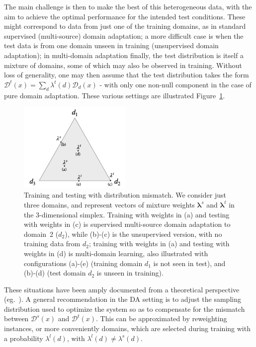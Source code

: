\documentclass[11pt]{article}
\newcommand{\vlambda}{\ensuremath{\boldsymbol\lambda}\xspace} %
\begin{document}
The main challenge is then to make the best of this heterogeneous data, with the aim to achieve the optimal performance for the intended test conditions. These might correspond to data from just one of the training domains, as in standard supervised (multi-source) domain adaptation; a more difficult case is when the test data is from one domain unseen in training (unsupervised domain adaptation); in multi-domain adaptation finally, the test distribution is itself a mixture of domains, some of which may also be observed in training.  Without loss of generality, one may then assume that the test distribution takes the form $\mathcal{D}^{t}(x) = \sum_d \lambda^{t}(d) \mathcal{D}_d(x)$ - with only one non-null  component in the case of pure domain adaptation.
These various settings are illustrated Figure~\ref{fig:mdmt-lambdas}.
\begin{figure}[h]
  \centering
  \includegraphics[width=0.48\textwidth]{mdmt-lambdas}
  \caption{Training and testing with distribution mismatch. We consider just three domains, and represent vectors of mixture weights $\vlambda^{s}$ and $\vlambda^{t}$ in the 3-dimensional simplex. Training with weights in (a) and testing with weights in (c) is supervised multi-source domain adaptation to domain~2 ($d_2$), while (b)-(c) is the unsupervised version, with no training data from $d_2$; training with weights in (a) and testing with weights in (d) is multi-domain learning, also illustrated with configurations (a)-(e) (training domain $d_1$ is not seen in test), and (b)-(d)  (test domain $d_2$ is unseen in training).}\label{fig:mdmt-lambdas}
\end{figure}

These situations have been amply documented from a theoretical perspective (eg.\ \cite{Mansour09multiple,Mansour09domainadaptation,Hoffman18algorithms}). A general recommendation in the DA setting is to adjust the sampling distribution used to optimize the system so as to compensate for the mismatch between $\mathcal{D}^s(x)$ and $\mathcal{D}^t(x)$. This can be approximated by reweighting instances, or more conveniently domains, which are selected during training with a probability $\lambda^{l}(d)$, with $\lambda^{l}(d) \neq \lambda^{s}(d)$.
\end{document}
